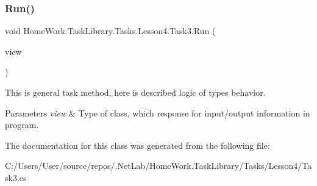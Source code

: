 \subsubsection{\texorpdfstring{Run()}{Run()}}
{\footnotesize\ttfamily void Home\+Work.\+Task\+Library.\+Tasks.\+Lesson4.\+Task3.\+Run (\begin{DoxyParamCaption}\item[{I\+Information}]{view }\end{DoxyParamCaption})}



This is general task method, here is described logic of types behavior. 


\begin{DoxyParams}{Parameters}
{\em view} & Type of class, which response for input/output information in program.\\
\hline
\end{DoxyParams}


The documentation for this class was generated from the following file\+:\begin{DoxyCompactItemize}
\item 
C\+:/\+Users/\+User/source/repos/.\+Net\+Lab/\+Home\+Work.\+Task\+Library/\+Tasks/\+Lesson4/Task3.\+cs\end{DoxyCompactItemize}
